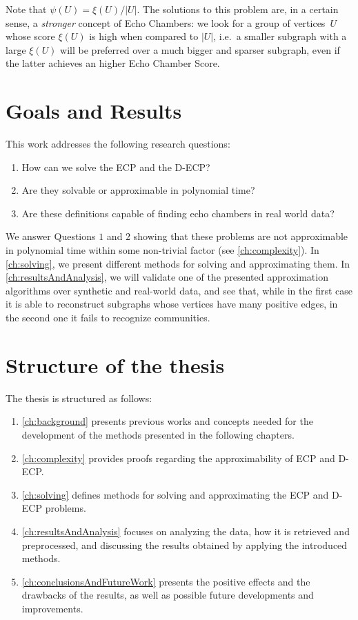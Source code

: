 Note that $\psi(U) = \xi(U) / |U|$. The solutions to this problem are, in a certain sense, a \emph{stronger} concept of Echo
Chambers: we look for a group of vertices~$U$ whose
score $\xi(U)$ is high when compared to $|U|$, i.e.\ a smaller subgraph with a
large $\xi(U)$ will be preferred over a much bigger and sparser subgraph, even
if the latter achieves an higher Echo Chamber Score.

\section{Goals and Results}
\label{sec:goals}

This work addresses the following research questions:

\begin{enumerate}
	\item How can we solve the \acrlong{ECP} and the \acrlong{D-ECP}?
	\item Are they solvable or approximable in polynomial time?
	\item Are these definitions capable of finding echo chambers in real world
	      data?
\end{enumerate}

We answer Questions $1$ and $2$ showing that these problems are not approximable in polynomial time within
some non-trivial factor (see \autoref{ch:complexity}). In \autoref{ch:solving}, we present different methods for solving and
approximating them. In \autoref{ch:resultsAndAnalysis}, we will validate one of the presented approximation
algorithms over synthetic and real-world data, and see that, while in the first
case it is able to reconstruct subgraphs whose vertices have many positive edges, in
the second one it fails to recognize communities.

\section{Structure of the thesis}
\label{sec:structure-thesis}

The thesis is structured as follows:

\begin{enumerate}
	\item \autoref{ch:background} presents previous works and concepts
	      needed for the development of the methods presented in
	      the following chapters.
	\item \autoref{ch:complexity} provides proofs regarding the approximability
	      of \acrshort{ECP} and \acrshort{D-ECP}.
	\item \autoref{ch:solving} defines methods for solving
	      and approximating the \acrshort{ECP} and \acrshort{D-ECP} problems.
	\item \autoref{ch:resultsAndAnalysis} focuses on analyzing the
	      data, how it is retrieved and preprocessed, and discussing the results
	      obtained by applying the introduced methods.
	\item \autoref{ch:conclusionsAndFutureWork} presents the positive effects
	      and the drawbacks of the results, as well as possible future
	      developments and improvements.
\end{enumerate}

